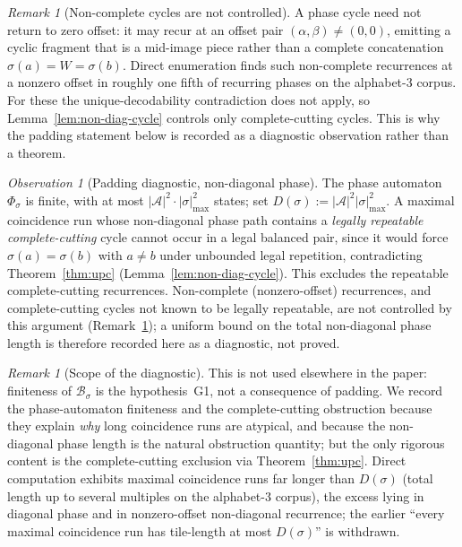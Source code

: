 \documentclass[11pt]{article}
\theoremstyle{plain}
\theoremstyle{definition}
\theoremstyle{remark}
\newtheorem{remark}[theorem]{Remark}
\newtheorem{observation}[theorem]{Observation}
\newcommand{\A}{\mathcal{A}}
\newcommand{\B}{\mathcal{B}}
\begin{document}
\begin{remark}[Non-complete cycles are not controlled]\label{rem:nonzero-offset}
A phase cycle need not return to zero offset: it may recur at an offset pair $(\alpha,\beta)\ne(0,0)$, emitting a cyclic fragment that is a mid-image piece rather than a complete concatenation $\sigma(a)=W=\sigma(b)$. Direct enumeration finds such non-complete recurrences at a nonzero offset in roughly one fifth of recurring phases on the alphabet-$3$ corpus. For these the unique-decodability contradiction does not apply, so Lemma~\ref{lem:non-diag-cycle} controls only complete-cutting cycles. This is why the padding statement below is recorded as a diagnostic observation rather than a theorem.
\end{remark}

\begin{observation}[Padding diagnostic, non-diagonal phase]\label{prop:padding}
The phase automaton $\Phi_\sigma$ is finite, with at most $|\A|^2\cdot|\sigma|_{\max}^2$ states; set $D(\sigma):=|\A|^2|\sigma|_{\max}^2$. A maximal coincidence run whose non-diagonal phase path contains a \emph{legally repeatable complete-cutting} cycle cannot occur in a legal balanced pair, since it would force $\sigma(a)=\sigma(b)$ with $a\ne b$ under unbounded legal repetition, contradicting Theorem~\ref{thm:upc} (Lemma~\ref{lem:non-diag-cycle}). This excludes the repeatable complete-cutting recurrences. Non-complete (nonzero-offset) recurrences, and complete-cutting cycles not known to be legally repeatable, are not controlled by this argument (Remark~\ref{rem:nonzero-offset}); a uniform bound on the total non-diagonal phase length is therefore recorded here as a diagnostic, not proved.
\end{observation}

\begin{remark}[Scope of the diagnostic]
This is not used elsewhere in the paper: finiteness of $\B_\sigma$ is the hypothesis~G1, not a consequence of padding. We record the phase-automaton finiteness and the complete-cutting obstruction because they explain \emph{why} long coincidence runs are atypical, and because the non-diagonal phase length is the natural obstruction quantity; but the only rigorous content is the complete-cutting exclusion via Theorem~\ref{thm:upc}. Direct computation exhibits maximal coincidence runs far longer than $D(\sigma)$ (total length up to several multiples on the alphabet-$3$ corpus), the excess lying in diagonal phase and in nonzero-offset non-diagonal recurrence; the earlier ``every maximal coincidence run has tile-length at most $D(\sigma)$'' is withdrawn.
\end{remark}
\end{document}
